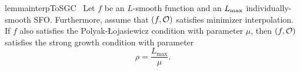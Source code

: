 \begin{restatable}{lemma}{interpToSGC}~\label{lemma:interpolation_to_sgc}
    Let \( f \) be an \( L \)-smooth function and \oracle{} an \( \Lmax \) individually-smooth \ac{SFO}.
    Furthermore, assume that \( \rbr{f, \oracle{}} \) satisfies minimizer interpolation.
    If \( f \) also satisfies the Polyak-Łojasiewicz condition with parameter \( \mu \), then \( \rbr{f, \oracle{}} \) satisfies the strong growth condition with parameter
    \[ \rho = \frac{L_{\text{max}}}{\mu}. \]
\end{restatable}
